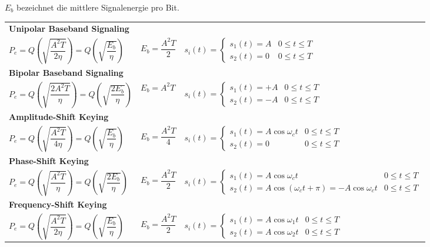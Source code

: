 \label{09_binary_signals_error}
\small{$E_b$ bezeichnet die mittlere Signalenergie pro Bit.}\\
\renewcommand{\arraystretch}{2.5}
	\begin{tabular}{ p{6cm} p{2.5cm} p{9cm} }		
		\multicolumn{3}{l}{\textbf{Unipolar Baseband Signaling}} \\
		$ P_e = Q\left(\sqrt{\dfrac{A^2 T}{2 \eta}}\right) = Q\left(\sqrt{\dfrac{E_b}{\eta}}\right) $
		& $ E_b = \dfrac{A^2 T}{2} $
		& $ s_i(t) = \begin{cases}
		     s_1(t) = A & 0 \leq t \leq T \\       
		     s_2(t) = 0 & 0 \leq t \leq T
		   \end{cases}$ \\  

		\multicolumn{3}{l}{\textbf{Bipolar Baseband Signaling}} \\
		$ P_e = Q\left(\sqrt{\dfrac{2 A^2 T}{\eta}}\right) = Q\left(\sqrt{\dfrac{2 E_b}{\eta}}\right) $
		& $ E_b = A^2 T $
		& $ s_i(t) = \begin{cases}
 		     s_1(t) = +A & 0 \leq t \leq T \\       
 		     s_2(t) = -A & 0 \leq t \leq T
 		   \end{cases} $ \\

		\multicolumn{3}{l}{\textbf{Amplitude-Shift Keying}} \\
		$ P_e = Q\left(\sqrt{\dfrac{A^2 T}{4 \eta}}\right) = Q\left(\sqrt{\dfrac{E_b}{\eta}}\right) $
		& $ E_b = \dfrac{A^2 T}{4} $
		& $ s_i(t) = \begin{cases}
 		     s_1(t) = A \cos{\omega_c t} & 0 \leq t \leq T \\       
 		     s_2(t) = 0 & 0 \leq t \leq T
 		   \end{cases} $ \\

		\multicolumn{3}{l}{\textbf{Phase-Shift Keying}} \\
		$ P_e = Q\left(\sqrt{\dfrac{A^2 T}{\eta}}\right) = Q\left(\sqrt{\dfrac{2 E_b}{\eta}}\right)  $
		& $ E_b = \dfrac{A^2 T}{2} $
		& $ s_i(t) = \begin{cases}
 		     s_1(t) = A \cos{\omega_c t} & 0 \leq t \leq T \\       
 		     s_2(t) = A \cos{(\omega_c t + \pi)} = - A \cos{\omega_c t} & 0 \leq t \leq T
 		   \end{cases} $ \\

		\multicolumn{3}{l}{\textbf{Frequency-Shift Keying}} \\
		$ P_e = Q\left(\sqrt{\dfrac{A^2 T}{2 \eta}}\right) = Q\left(\sqrt{\dfrac{E_b}{\eta}}\right) $
		& $ E_b = \dfrac{A^2 T}{2} $
		& $ s_i(t) = \begin{cases}
 		     s_1(t) = A \cos{\omega_1 t} & 0 \leq t \leq T \\       
 		     s_2(t) = A \cos{\omega_2 t} & 0 \leq t \leq T
 		   \end{cases}$ \\

 	\end{tabular}
	\renewcommand{\arraystretch}{1}
